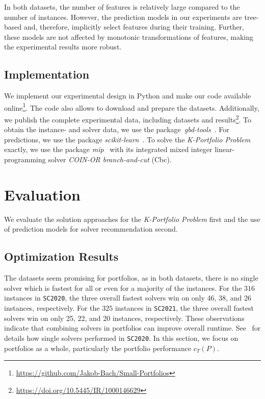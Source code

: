 \documentclass[a4paper,USenglish,pdfa]{lipics-v2021} %
\begin{document}
In both datasets, the number of features is relatively large compared to the number of instances.
However, the prediction models in our experiments are tree-based and, therefore, implicitly select features during their training.
Further, these models are not affected by monotonic transformations of features, making the experimental results more robust.

\subsection{Implementation}
\label{sec:experimental-design:impl}

We implement our experimental design in Python and make our code available online\footnote{\url{https://github.com/Jakob-Bach/Small-Portfolios}}.
The code also allows to download and prepare the datasets.
Additionally, we publish the complete experimental data, including datasets and results\footnote{\url{https://doi.org/10.5445/IR/1000146629}}.
To obtain the instance- and solver data, we use the package~\emph{gbd-tools}~\cite{iser2020collaborative}.
For predictions, we use the package \emph{scikit-learn}~\cite{scikit-learn}.
To solve the \emph{K-Portfolio Problem} exactly, we use the package \emph{mip}~\cite{python-mip} with its integrated mixed integer linear-programming solver \emph{COIN-OR branch-and-cut} (Cbc).

\section{Evaluation}
\label{sec:evaluation}

We evaluate the solution approaches for the \emph{K-Portfolio Problem} first and the use of prediction models for solver recommendation second.

\subsection{Optimization Results}

The datasets seem promising for portfolios, as in both datasets, there is no single solver which is fastest for all or even for a majority of the instances.
For the $316$ instances in \texttt{SC2020}, the three overall fastest solvers win on only 46, 38, and 26 instances, respectively.
For the $325$ instances in \texttt{SC2021}, the three overall fastest solvers win on only 25, 22, and 20 instances, respectively.
These observations indicate that combining solvers in portfolios can improve overall runtime.
See~\cite{SC2020:AIJ} for details how single solvers performed in \texttt{SC2020}.
In this section, we focus on portfolios as a whole, particularly the portfolio performance $c_T(P)$.
\end{document}
